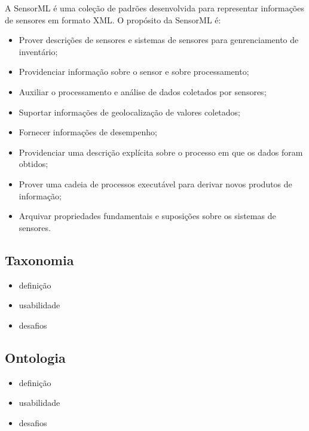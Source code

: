      A \acrfull{SensorML} \cite{SML} é uma coleção de padrões
    desenvolvida para representar informações de sensores em formato XML. O propósito da \acrshort{SensorML} é:
    \begin{itemize}
      \item Prover descrições de sensores e sistemas de sensores para genrenciamento de inventário;
      \item Providenciar informação sobre o sensor e sobre processamento;
      \item Auxiliar o processamento e análise de dados coletados por sensores;
      \item Suportar informações de geolocalização de valores coletados;
      \item Fornecer informações de desempenho;
      \item Providenciar uma descrição explícita sobre o processo em que os dados foram obtidos;
      \item Prover uma cadeia de processos executável para derivar novos produtos de informação;
      \item Arquivar propriedades fundamentais e suposições sobre os sistemas de sensores.
    \end{itemize}
	\subsection{Taxonomia}
		\begin{itemize}
			\item definição
			\item usabilidade
			\item desafios
		\end{itemize}
	\subsection{Ontologia}
		\begin{itemize}
			\item definição
		 	\item usabilidade
			\item desafios
		\end{itemize}
